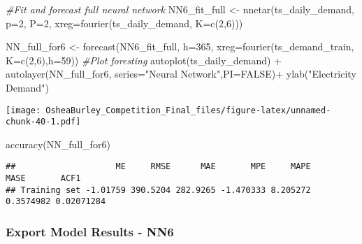 \documentclass[
]{article}
\newenvironment{Shaded}{\begin{snugshade}}{\end{snugshade}}
\newcommand{\AttributeTok}[1]{\textcolor[rgb]{0.77,0.63,0.00}{#1}}
\newcommand{\CommentTok}[1]{\textcolor[rgb]{0.56,0.35,0.01}{\textit{#1}}}
\newcommand{\ConstantTok}[1]{\textcolor[rgb]{0.00,0.00,0.00}{#1}}
\newcommand{\DecValTok}[1]{\textcolor[rgb]{0.00,0.00,0.81}{#1}}
\newcommand{\FunctionTok}[1]{\textcolor[rgb]{0.00,0.00,0.00}{#1}}
\newcommand{\NormalTok}[1]{#1}
\newcommand{\OtherTok}[1]{\textcolor[rgb]{0.56,0.35,0.01}{#1}}
\newcommand{\SpecialCharTok}[1]{\textcolor[rgb]{0.00,0.00,0.00}{#1}}
\newcommand{\StringTok}[1]{\textcolor[rgb]{0.31,0.60,0.02}{#1}}
\begin{document}
\begin{Shaded}
\begin{Highlighting}[]
\CommentTok{\#Fit and forecast full neural network}
\NormalTok{NN6\_fit\_full }\OtherTok{\textless{}{-}}  \FunctionTok{nnetar}\NormalTok{(ts\_daily\_demand,}
                 \AttributeTok{p=}\DecValTok{2}\NormalTok{,}
                 \AttributeTok{P=}\DecValTok{2}\NormalTok{,}
                 \AttributeTok{xreg=}\FunctionTok{fourier}\NormalTok{(ts\_daily\_demand, }\AttributeTok{K=}\FunctionTok{c}\NormalTok{(}\DecValTok{2}\NormalTok{,}\DecValTok{6}\NormalTok{)))}

\NormalTok{NN\_full\_for6 }\OtherTok{\textless{}{-}} \FunctionTok{forecast}\NormalTok{(NN6\_fit\_full, }
                   \AttributeTok{h=}\DecValTok{365}\NormalTok{,}
                   \AttributeTok{xreg=}\FunctionTok{fourier}\NormalTok{(ts\_demand\_train, }
                                          \AttributeTok{K=}\FunctionTok{c}\NormalTok{(}\DecValTok{2}\NormalTok{,}\DecValTok{6}\NormalTok{),}\AttributeTok{h=}\DecValTok{59}\NormalTok{))}
\CommentTok{\#Plot foresting }
\FunctionTok{autoplot}\NormalTok{(ts\_daily\_demand) }\SpecialCharTok{+}
  \FunctionTok{autolayer}\NormalTok{(NN\_full\_for6, }\AttributeTok{series=}\StringTok{"Neural Network"}\NormalTok{,}\AttributeTok{PI=}\ConstantTok{FALSE}\NormalTok{)}\SpecialCharTok{+}
  \FunctionTok{ylab}\NormalTok{(}\StringTok{"Electricity Demand"}\NormalTok{) }
\end{Highlighting}
\end{Shaded}

\texttt{[image: OsheaBurley\_Competition\_Final\_files/figure-latex/unnamed-chunk-40-1.pdf]}

\begin{Shaded}
\begin{Highlighting}[]
\FunctionTok{accuracy}\NormalTok{(NN\_full\_for6)}
\end{Highlighting}
\end{Shaded}

\begin{verbatim}
##                    ME     RMSE      MAE       MPE     MAPE      MASE       ACF1
## Training set -1.01759 390.5204 282.9265 -1.470333 8.205272 0.3574982 0.02071284
\end{verbatim}

\hypertarget{export-model-results---nn6}{%
\subsubsection{Export Model Results -
NN6}\label{export-model-results---nn6}}
\end{document}
